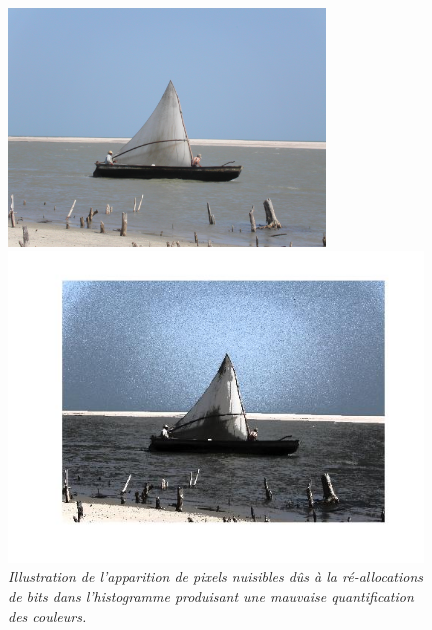 \documentclass{article}
\begin{document}
\begin{figure}[!hbt]
\centering
\begin{minipage}{0.5\textwidth}
\centering
\includegraphics[width=0.75\textwidth]{../pictures/brasil.jpg}
\end{minipage}%
\begin{minipage}{0.5\textwidth}
\centering
\includegraphics[width=0.98\textwidth]{images/p1_brasil.jpg}
\end{minipage}
\caption{\textit{Illustration de l'apparition de pixels nuisibles dûs à la ré-allocations de bits dans l'histogramme produisant une mauvaise quantification des couleurs.}}
\label{fig:p1_brasil}
\end{figure}
\end{document}
